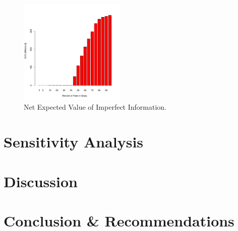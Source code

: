 \documentclass[11pt, letterpaper]{article}
\begin{document}
\begin{figure}[h]
\centering
\includegraphics[width=0.45\textwidth]{../../R/alt3Barplot.pdf}
\caption{Net Expected Value of Imperfect Information.}
\label{fig:evii}
\end{figure}



\section{Sensitivity Analysis} \label{sensitivity}


\section{Discussion} \label{discussion}


\section{Conclusion \& Recommendations} \label{conclusion}


\pagebreak
\pagebreak
\begin{multicols}{2}
\printbibliography[heading=none]
\end{multicols}
\end{document}
